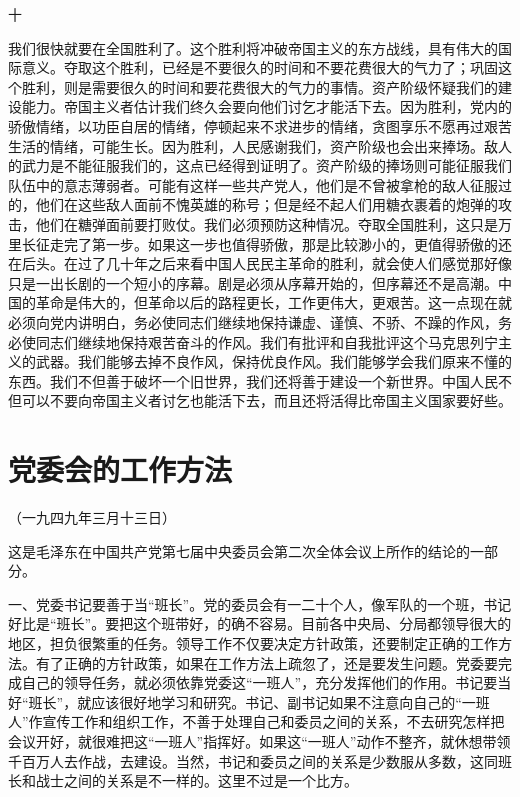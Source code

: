 \documentclass[UTF-8, a5paper, 12pt]{ctexart}
\begin{document}
十

我们很快就要在全国胜利了。这个胜利将冲破帝国主义的东方战线，具有伟大的国际意义。夺取这个胜利，已经是不要很久的时间和不要花费很大的气力了；巩固这个胜利，则是需要很久的时间和要花费很大的气力的事情。资产阶级怀疑我们的建设能力。帝国主义者估计我们终久会要向他们讨乞才能活下去。因为胜利，党内的骄傲情绪，以功臣自居的情绪，停顿起来不求进步的情绪，贪图享乐不愿再过艰苦生活的情绪，可能生长。因为胜利，人民感谢我们，资产阶级也会出来捧场。敌人的武力是不能征服我们的，这点已经得到证明了。资产阶级的捧场则可能征服我们队伍中的意志薄弱者。可能有这样一些共产党人，他们是不曾被拿枪的敌人征服过的，他们在这些敌人面前不愧英雄的称号；但是经不起人们用糖衣裹着的炮弹的攻击，他们在糖弹面前要打败仗。我们必须预防这种情况。夺取全国胜利，这只是万里长征走完了第一步。如果这一步也值得骄傲，那是比较渺小的，更值得骄傲的还在后头。在过了几十年之后来看中国人民民主革命的胜利，就会使人们感觉那好像只是一出长剧的一个短小的序幕。剧是必须从序幕开始的，但序幕还不是高潮。中国的革命是伟大的，但革命以后的路程更长，工作更伟大，更艰苦。这一点现在就必须向党内讲明白，务必使同志们继续地保持谦虚、谨慎、不骄、不躁的作风，务必使同志们继续地保持艰苦奋斗的作风。我们有批评和自我批评这个马克思列宁主义的武器。我们能够去掉不良作风，保持优良作风。我们能够学会我们原来不懂的东西。我们不但善于破坏一个旧世界，我们还将善于建设一个新世界。中国人民不但可以不要向帝国主义者讨乞也能活下去，而且还将活得比帝国主义国家要好些。

\section{党委会的工作方法}

（一九四九年三月十三日）

这是毛泽东在中国共产党第七届中央委员会第二次全体会议上所作的结论的一部分。

一、党委书记要善于当“班长”。党的委员会有一二十个人，像军队的一个班，书记好比是“班长”。要把这个班带好，的确不容易。目前各中央局、分局都领导很大的地区，担负很繁重的任务。领导工作不仅要决定方针政策，还要制定正确的工作方法。有了正确的方针政策，如果在工作方法上疏忽了，还是要发生问题。党委要完成自己的领导任务，就必须依靠党委这“一班人”，充分发挥他们的作用。书记要当好“班长”，就应该很好地学习和研究。书记、副书记如果不注意向自己的“一班人”作宣传工作和组织工作，不善于处理自己和委员之间的关系，不去研究怎样把会议开好，就很难把这“一班人”指挥好。如果这“一班人”动作不整齐，就休想带领千百万人去作战，去建设。当然，书记和委员之间的关系是少数服从多数，这同班长和战士之间的关系是不一样的。这里不过是一个比方。
\end{document}
